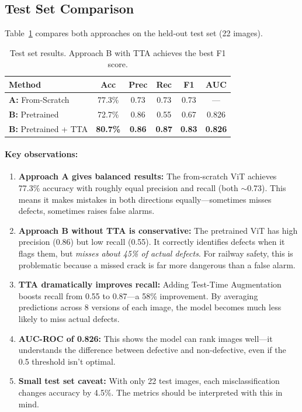 \documentclass[10pt,twocolumn,letterpaper]{article}
\begin{document}
\subsection{Test Set Comparison}

Table~\ref{tab:results} compares both approaches on the held-out test set (22 images).

\begin{table}[h]
\centering
\caption{Test set results. Approach B with TTA achieves the best F1 score.}
\label{tab:results}
\small
\begin{tabular}{lccccc}
\toprule
\textbf{Method} & \textbf{Acc} & \textbf{Prec} & \textbf{Rec} & \textbf{F1} & \textbf{AUC} \\
\midrule
\textbf{A:} From-Scratch & 77.3\% & 0.73 & 0.73 & 0.73 & --- \\
\textbf{B:} Pretrained & 72.7\% & 0.86 & 0.55 & 0.67 & 0.826 \\
\textbf{B:} Pretrained + TTA & \textbf{80.7\%} & \textbf{0.86} & \textbf{0.87} & \textbf{0.83} & \textbf{0.826} \\
\bottomrule
\end{tabular}
\end{table}

\paragraph{Key observations:}

\begin{enumerate}[leftmargin=*, itemsep=3pt]
    \item \textbf{Approach A gives balanced results:} The from-scratch ViT achieves 77.3\% accuracy with roughly equal precision and recall (both $\sim$0.73). This means it makes mistakes in both directions equally---sometimes misses defects, sometimes raises false alarms.
    
    \item \textbf{Approach B without TTA is conservative:} The pretrained ViT has high precision (0.86) but low recall (0.55). It correctly identifies defects when it flags them, but \textit{misses about 45\% of actual defects}. For railway safety, this is problematic because a missed crack is far more dangerous than a false alarm.
    
    \item \textbf{TTA dramatically improves recall:} Adding Test-Time Augmentation boosts recall from 0.55 to 0.87---a 58\% improvement. By averaging predictions across 8 versions of each image, the model becomes much less likely to miss actual defects.
    
    \item \textbf{AUC-ROC of 0.826:} This shows the model can rank images well---it understands the difference between defective and non-defective, even if the 0.5 threshold isn't optimal.
    
    \item \textbf{Small test set caveat:} With only 22 test images, each misclassification changes accuracy by 4.5\%. The metrics should be interpreted with this in mind.
\end{enumerate}
\end{document}
